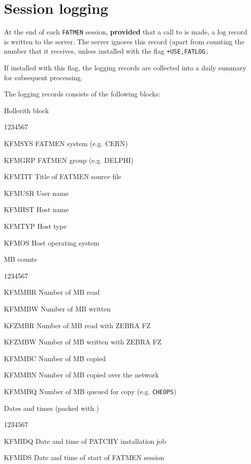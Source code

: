 \section{Session logging}

At the end of each {\tt FATMEN} session, {\bf provided} that a
call to  is made, a log record is written to
the server. The server ignores this record (apart from
counting the number that it receives, unless installed
with the flag {\tt +USE,FATLOG.}

If installed with this flag, the logging records are
collected into a daily summary for subsequent processing.

The logging records consists of the following blocks:

\begin{OL}
\item
Hollerith block
\begin{DLtt}{1234567}
\item[KFMSYS]FATMEN system (e.g. CERN)
\item[KFMGRP]FATMEN group (e.g. DELPHI)
\item[KFMTIT]Title of FATMEN source file
\item[KFMUSR]User name
\item[KFMHST]Host name
\item[KFMTYP]Host type
\item[KFMOS]Host operating system
\end{DLtt}
\item
MB counts
\begin{DLtt}{1234567}
\item[KFMMBR]Number of MB read
\item[KFMMBW]Number of MB written
\item[KFZMBR]Number of MB read with ZEBRA FZ
\item[KFZMBW]Number of MB written with ZEBRA FZ
\item[KFMMBC]Number of MB copied
\item[KFMMBN]Number of MB copied over the network
\item[KFMMBQ]Number of MB queued for copy (e.g. {\tt CHEOPS})
\end{DLtt}
\item
Dates and times (packed with )
\begin{DLtt}{1234567}
\item[KFMIDQ]Date and time of PATCHY installation job
\item[KFMIDS]Date and time of start of FATMEN session

\end{DLtt}
\end{OL}

